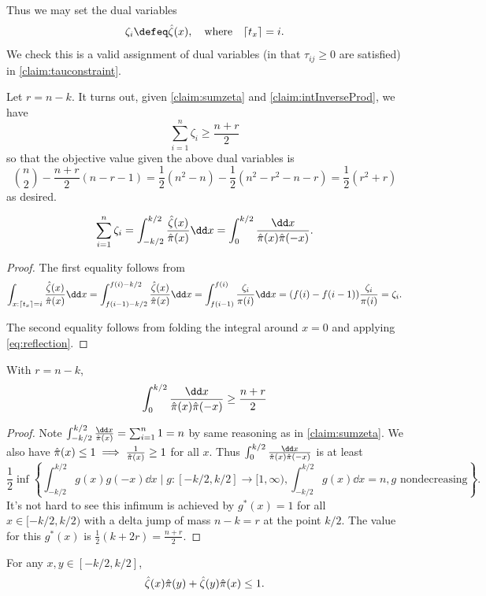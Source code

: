 \documentclass[main.tex]{subfiles}
\begin{document}
Thus we may set the dual variables
\[
\zeta_{i}\defeq\zzeta(x),\quad\text{where}\quad\lceil t_{x}\rceil=i.
\]
We check this is a valid assignment of dual variables (in that $\tau_{ij}\ge0$ are satisfied) in \cref{claim:tauconstraint}. 

Let $r=n-k$. It turns out, given \cref{claim:sumzeta} and \cref{claim:intInverseProd}, we have
\[
\sum_{i=1}^{n}\zeta_{i}\ge\frac{n+r}{2}
\]
so that the objective value given the above dual variables is
\[
\binom{n}{2}-\frac{n+r}{2}(n-r-1)=\frac{1}{2}(n^{2}-n)-\frac{1}{2}(n^{2}-r^{2}-n-r)=\frac{1}{2}(r^{2}+r)
\]
as desired.
\begin{claim}
\label{claim:sumzeta}
\[
\sum_{i=1}^{n}\zeta_{i}=\int_{-k/2}^{k/2}\frac{\zzeta(x)}{\ppi(x)}\dd x=\int_{0}^{k/2}\frac{\dd x}{\ppi(x)\ppi(-x)}.
\]
\end{claim}

\begin{proof}
The first equality follows from 
\[
\int_{x:\lceil t_{x}\rceil=i}\frac{\zzeta(x)}{\ppi(x)}\dd x=\int_{f(i-1)-k/2}^{f(i)-k/2}\frac{\zzeta(x)}{\ppi(x)}\dd x=\int_{f(i-1)}^{f(i)}\frac{\zeta_{i}}{\pi(i)}\dd x=(f(i)-f(i-1))\frac{\zeta_{i}}{\pi(i)}=\zeta_{i}.
\]

The second equality follows from folding the integral around $x=0$ and applying \cref{eq:reflection}.
\end{proof}
\begin{claim}
\label{claim:intInverseProd}With $r=n-k$,
\[
\int_{0}^{k/2}\frac{\dd x}{\ppi(x)\ppi(-x)}\ge\frac{n+r}{2}
\]
\end{claim}

\begin{proof}
Note $\int_{-k/2}^{k/2}\frac{\dd x}{\ppi(x)}=\sum_{i=1}^{n}1=n$ by same reasoning as in \cref{claim:sumzeta}. We also have $\hat{\pi}(x)\le1\implies\frac{1}{\hat{\pi}(x)}\ge1$ for all $x$. Thus $\int_{0}^{k/2}\frac{\dd x}{\ppi(x)\ppi(-x)}$ is at least
\[
\frac{1}{2}\inf\left\{ \int_{-k/2}^{k/2}g(x)g(-x)\dd x\mid g:[-k/2,k/2]\to[1,\infty),\int_{-k/2}^{k/2}g(x)\dd x=n,g\text{ nondecreasing}\right\} .
\]
It's not hard to see this infimum is achieved by $g^{*}(x)=1$ for all $x\in[-k/2,k/2)$ with a delta jump of mass $n-k=r$ at the point $k/2$. The value for this $g^{*}(x)$ is $\frac{1}{2}(k+2r)=\frac{n+r}{2}$.
\end{proof}
\begin{claim}
\label{claim:tauconstraint}For any $x,y\in[-k/2,k/2]$,
\[
\hat{\zeta}(x)\hat{\pi}(y)+\hat{\zeta}(y)\hat{\pi}(x)\le1.
\]
\end{claim}
\end{document}
